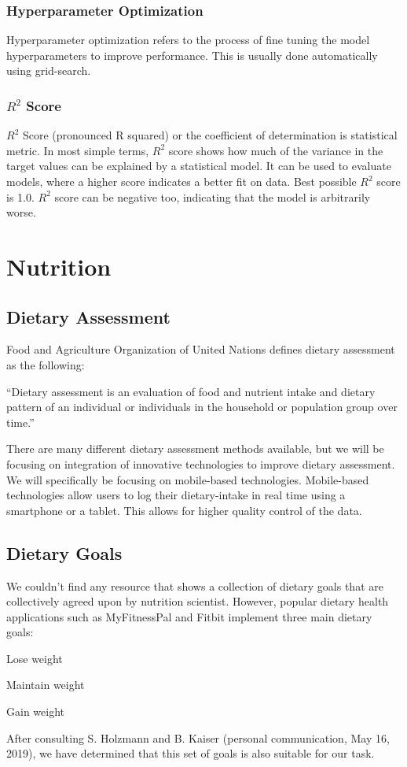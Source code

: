 \subsubsection{Hyperparameter Optimization}
Hyperparameter optimization refers to the process of fine tuning the model hyperparameters to improve performance.
This is usually done automatically using grid-search.\parencite{homl:2} 

\subsubsection{$R^2$ Score}
$R^2$ Score (pronounced R squared) or the coefficient of determination is statistical metric.
In most simple terms, $R^2$ score shows how much of the variance in the target values can be explained by a statistical model.
It can be used to evaluate models, where a higher score indicates a better fit on data.
Best possible $R^2$ score is 1.0.
$R^2$ score can be negative too, indicating that the model is arbitrarily worse.\parencite{r2score}


\section{Nutrition}
\subsection{Dietary Assessment}
Food and Agriculture Organization of United Nations defines dietary assessment as the following:

``Dietary assessment is an evaluation of food and nutrient intake and dietary pattern of an individual or individuals in the household or population group over time.''
\parencite{faoun}

There are many different dietary assessment methods available, but we will be focusing on integration of innovative technologies to improve dietary assessment.
We will specifically be focusing on mobile-based technologies.
Mobile-based technologies allow users to log their dietary-intake in real time using a smartphone or a tablet.
This allows for higher quality control of the data.\parencite{faoun}
\subsection{Dietary Goals}
We couldn't find any resource that shows a collection of dietary goals that are collectively agreed upon by nutrition scientist.
However, popular dietary health applications such as MyFitnessPal and Fitbit implement three main dietary goals:

Lose weight

Maintain weight

Gain weight

After consulting S. Holzmann and B. Kaiser (personal communication, May 16, 2019), we have determined that this set of goals is also suitable for our task.
